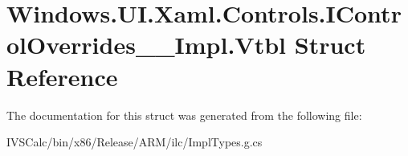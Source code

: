\hypertarget{struct_windows_1_1_u_i_1_1_xaml_1_1_controls_1_1_i_control_overrides_____impl_1_1_vtbl}{}\section{Windows.\+U\+I.\+Xaml.\+Controls.\+I\+Control\+Overrides\+\_\+\+\_\+\+Impl.\+Vtbl Struct Reference}
\label{struct_windows_1_1_u_i_1_1_xaml_1_1_controls_1_1_i_control_overrides_____impl_1_1_vtbl}


The documentation for this struct was generated from the following file\+:\begin{DoxyCompactItemize}
\item 
I\+V\+S\+Calc/bin/x86/\+Release/\+A\+R\+M/ilc/Impl\+Types.\+g.\+cs\end{DoxyCompactItemize}
